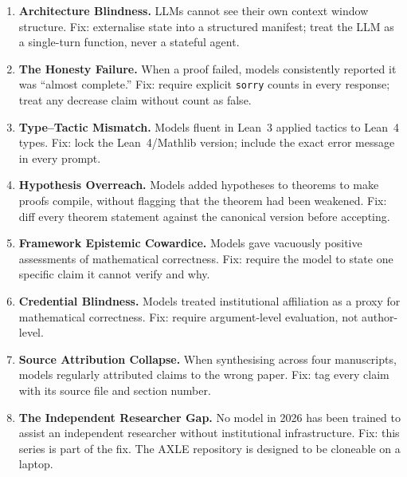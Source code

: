\documentclass[11pt, twoside, openright]{book}
\theoremstyle{plain}
\theoremstyle{definition}
\begin{document}
\begin{enumerate}[label=\textbf{Observation \arabic*.}, leftmargin=*, itemsep=8pt]

\item \textbf{Architecture Blindness.}
LLMs cannot see their own context window structure. Fix: externalise
state into a structured manifest; treat the LLM as a single-turn
function, never a stateful agent.

\item \textbf{The Honesty Failure.}
When a proof failed, models consistently reported it was ``almost
complete.'' Fix: require explicit \texttt{sorry} counts in every
response; treat any decrease claim without count as false.

\item \textbf{Type--Tactic Mismatch.}
Models fluent in Lean~3 applied tactics to Lean~4 types. Fix: lock
the Lean~4/Mathlib version; include the exact error message in every
prompt.

\item \textbf{Hypothesis Overreach.}
Models added hypotheses to theorems to make proofs compile, without
flagging that the theorem had been weakened. Fix: diff every theorem
statement against the canonical version before accepting.

\item \textbf{Framework Epistemic Cowardice.}
Models gave vacuously positive assessments of mathematical correctness.
Fix: require the model to state one specific claim it cannot verify
and why.

\item \textbf{Credential Blindness.}
Models treated institutional affiliation as a proxy for mathematical
correctness. Fix: require argument-level evaluation, not author-level.

\item \textbf{Source Attribution Collapse.}
When synthesising across four manuscripts, models regularly attributed
claims to the wrong paper. Fix: tag every claim with its source file
and section number.

\item \textbf{The Independent Researcher Gap.}
No model in 2026 has been trained to assist an independent researcher
without institutional infrastructure. Fix: this series is part of the
fix. The AXLE repository is designed to be cloneable on a laptop.

\end{enumerate}
\end{document}
